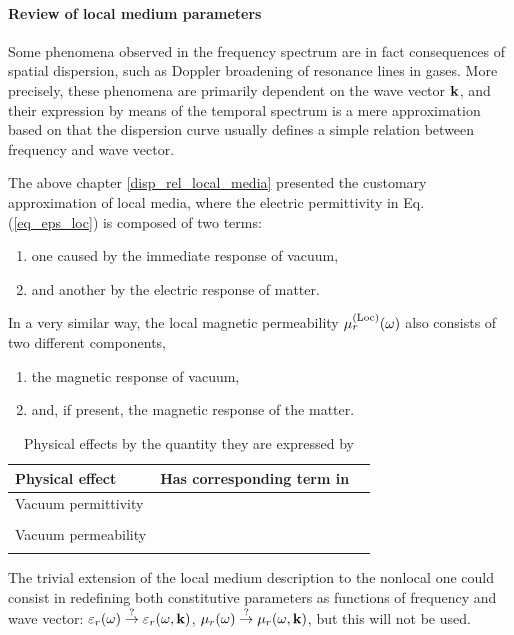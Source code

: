 \paragraph{Review of local medium parameters}%
Some phenomena observed in the frequency spectrum are in fact consequences of spatial dispersion, such as Doppler broadening of resonance lines in gases.\cite[p. 359]{landau1984electrodynamics} More precisely, these phenomena are primarily dependent on the wave vector ${\mathbf{k}}$, and their expression by means of the temporal spectrum is a mere approximation based on that the dispersion curve usually defines a simple relation between  frequency and wave vector. 

The above chapter \ref{disp_rel_local_media} presented the customary approximation of local media, where the electric permittivity in Eq. (\ref{eq_eps_loc}) is composed of two terms: 
\begin{enumerate}
 \item{one caused  by the immediate response of vacuum,} 
 \item{and another by the electric response of matter.}
 \end{enumerate}
In a very similar way, the local magnetic permeability $\mu^{\rm(Loc)}_r(\omega)$ also consists of two different components, 
\begin{enumerate}[resume]
 \item{the magnetic response of vacuum,} 
 \item{and, if present, the magnetic response of the matter.} 
\end{enumerate}
\begin{table}[ht]   \caption{Physical effects by the quantity they are expressed by}  \label{tb_nonlocaleff} \centering 
\begin{tabular}{lcr}
 \toprule
Physical effect & Has corresponding term in \\
 \hline
Vacuum permittivity &	&	\\
 &	&	\\
Vacuum permeability &	&	\\
 &	&	\\
 \bottomrule
 \end{tabular} \end{table}


The trivial extension of the local medium description to the nonlocal one could consist in redefining both constitutive parameters as functions of frequency and wave vector: $\varepsilon_r(\omega) \stackrel{?}{\rightarrow} \varepsilon_r(\omega, {\mathbf{k}})$, $\mu_r(\omega) \stackrel{?}{\rightarrow} \mu_r(\omega, {\mathbf{k}})$, but this will not be used. 

